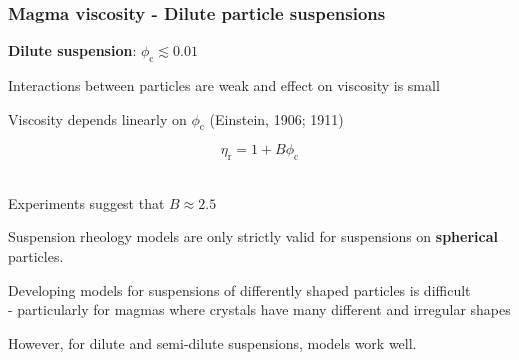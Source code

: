 \documentclass{beamer}
\begin{document}
\begin{frame}
  \frametitle{Magma viscosity - Dilute particle suspensions}

  \footnotesize \textbf{Dilute suspension}: $\phi_{\text{c}} \lesssim 0.01$ \\

  \vspace{0.5cm}

  Interactions between particles are weak and effect on viscosity is small \\

  \vspace{0.5cm}

  Viscosity depends linearly on $\phi_{\text{c}}$ (Einstein, 1906; 1911) \\

  \vspace{0.5cm}

  $$ \eta_{\text{r}} = 1 + B \phi_{\text{c}} $$ \\

  \vspace{0.5cm}

  Experiments suggest that $B \approx 2.5$ \\

  \vspace{0.5cm}

  Suspension rheology models are only strictly valid for suspensions on \textbf{spherical} particles. \\

  \vspace{0.5cm}

  Developing models for suspensions of differently shaped particles is difficult \\
  \hspace*{1cm} - particularly for magmas where crystals have many different and irregular shapes \\

  \vspace{0.5cm}

  However, for dilute and semi-dilute suspensions, models work well. \\
  
  \end{frame}
\end{document}
